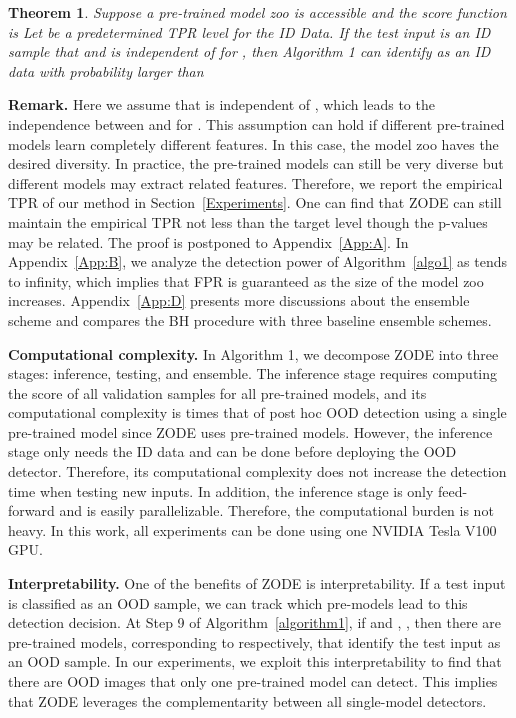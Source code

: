 \documentclass{article} \usepackage{iclr2023_conference,times}
\newtheorem{theorem}{Theorem}
\begin{document}
\begin{theorem}\label{Theorem1}
Suppose a pre-trained model zoo  is accessible and the score function is  Let  be a predetermined TPR level for the ID Data. If the test input  is an ID sample that  and  is independent of  for , then Algorithm 1 can identify  as an ID data with probability larger than 
\end{theorem}

{\bf Remark.} 
Here we assume that  is independent of , which leads to the independence between  and  for . 
This assumption can hold if different pre-trained models learn completely different features. 
In this case, the model zoo haves the desired diversity.
In practice, the pre-trained models can still be very diverse but different models may extract related features.
Therefore, we report the empirical TPR of our method in Section~\ref{Experiments}.
One can find that ZODE can still maintain the empirical TPR not less than the target level though the p-values may be related. 
The proof is postponed to Appendix~\ref{App:A}. In Appendix~\ref{App:B}, we analyze the detection power of Algorithm~\ref{algo1} as  tends to infinity, which implies that FPR is guaranteed as the size of the model zoo increases. Appendix~\ref{App:D} presents more discussions about the ensemble scheme and compares the BH procedure with three baseline ensemble schemes.

{\bf Computational complexity.} In Algorithm 1, we decompose ZODE into three stages: inference, testing, and ensemble. The inference stage requires computing the score of all validation samples for all pre-trained models,  and its computational complexity is  times that of post hoc OOD detection using a single pre-trained model since ZODE uses  pre-trained models. However, the inference stage only needs the ID data and can be done before deploying the OOD detector. Therefore, its computational complexity does not increase the detection time when testing new inputs. In addition, the inference stage is only feed-forward and is easily parallelizable. Therefore, the computational burden is not heavy. In this work, all experiments can be done using one NVIDIA Tesla V100 GPU. 


{\bf Interpretability.} One of the benefits of ZODE is interpretability. If a test input is classified as an OOD sample, we can track which pre-models lead to this detection decision.
At Step 9 of Algorithm~\ref{algorithm1}, if  and , , 
then there are  pre-trained models, corresponding to  respectively,  that identify the test input as an OOD sample.
In our experiments, we exploit this interpretability to find that there are OOD images that only one pre-trained model can detect. This implies that ZODE leverages the complementarity between all single-model detectors.
\end{document}

